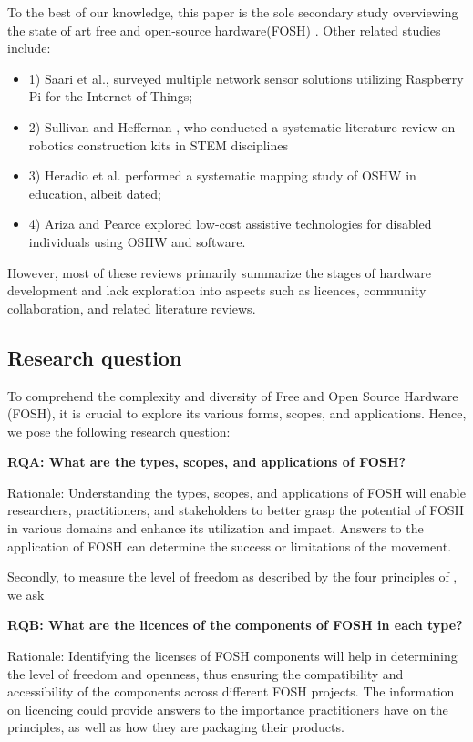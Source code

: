 \documentclass[final-report.tex]{subfiles}
\begin{document}
To the best of our knowledge, this paper is the sole secondary study overviewing the state of art free and open-source hardware(FOSH) . Other related studies include: 
\begin{itemize}
    \renewcommand{\labelitemi}{}
    \item 1) Saari et al.\cite{7973568}, surveyed multiple network sensor solutions utilizing Raspberry Pi for the Internet of Things; 
    \item 2) Sullivan and Heffernan \cite{sullivan2016robotic}, who conducted a systematic literature review on robotics construction kits in STEM disciplines
    \item 3) Heradio et al. \cite{heradio2018open} performed a systematic mapping study of OSHW in education, albeit dated; 
    \item 4) Ariza and Pearce \cite{ariza2022low} explored low-cost assistive technologies for disabled individuals using OSHW and software.
\end{itemize}
 However, most of these reviews primarily summarize the stages of hardware development and lack exploration into aspects such as licences, community collaboration, and related literature reviews.
 
\subsection{Research question}

To comprehend the complexity and diversity of Free and Open Source Hardware (FOSH), it is crucial to explore its various forms, scopes, and applications. Hence, we pose the following research question:

    \textbf{RQA: What are the types, scopes, and applications of FOSH?}
    
Rationale: Understanding the types, scopes, and applications of FOSH will enable researchers, practitioners, and stakeholders to better grasp the potential of FOSH in various domains and enhance its utilization and impact.
Answers to the application of FOSH can determine the success or limitations of the movement.

    \label{RQA}
    
Secondly, to measure the level of freedom as described by the four principles of \cite{b0_stallman}, we ask

    \textbf{RQB: What are the licences of the components of FOSH in each type?}
    
Rationale: Identifying the licenses of FOSH components will help in determining the level of freedom and openness, thus ensuring the compatibility and accessibility of the components across different FOSH projects.
The information on licencing could provide answers to the importance practitioners have on the principles, as well as how they are packaging their products. 
\end{document}
